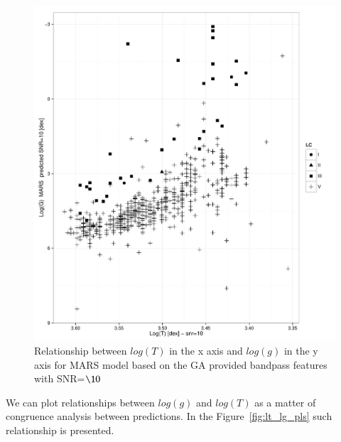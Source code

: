 \begin{figure}
 \begin{center}
 \includegraphics[width=12cm]{figs/ipac_LG_T_Mars_10.pdf}
 \caption{Relationship between $log(T) $ in the x axis 
 and $log(g)$ in the y axis for MARS model based on the GA provided bandpass features with SNR=$\10$}
 \label{fig:lt_lg_ga}
 \end{center}
\end{figure}

We can plot relationships between $log(g)$ and $log(T)$
as a matter of congruence analysis between predictions. In the Figure~\ref{fig:lt_lg_pls}
such relationship is presented.

